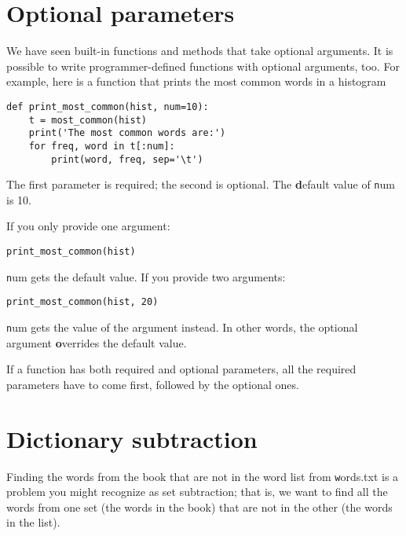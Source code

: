 \documentclass[
DIV=11,
fontsize=12,
twoside,
headinclude=false,
titlepage=firstiscover,
abstract=true,
headsepline=true,
footsepline=true,
chapterprefix=true, %
headings=big,
bibliography=totoc,%
captions=tableheading
]{scrbook}
\theoremstyle{definition}
\begin{document}
\section{Optional parameters}

We have seen built-in functions and methods that take optional
arguments.  It is possible to write programmer-defined functions
with optional arguments, too.  For example, here is a function that
prints the most common words in a histogram

\begin{lstlisting}
def print_most_common(hist, num=10):
    t = most_common(hist)
    print('The most common words are:')
    for freq, word in t[:num]:
        print(word, freq, sep='\t')
\end{lstlisting}

The first parameter is required; the second is optional.
The {\textbf default value} of {\texttt num} is 10.

If you only provide one argument:

\begin{lstlisting}
print_most_common(hist)
\end{lstlisting}

{\texttt num} gets the default value.  If you provide two arguments:

\begin{lstlisting}
print_most_common(hist, 20)
\end{lstlisting}

{\texttt num} gets the value of the argument instead.  In other
words, the optional argument {\textbf overrides} the default value.

If a function has both required and optional parameters, all
the required parameters have to come first, followed by the
optional ones.


\section{Dictionary subtraction}
\label{dictsub}

Finding the words from the book that are not in the word list
from {\texttt words.txt} is a problem you might recognize as set
subtraction; that is, we want to find all the words from one
set (the words in the book) that are not in the other (the
words in the list).
\end{document}
